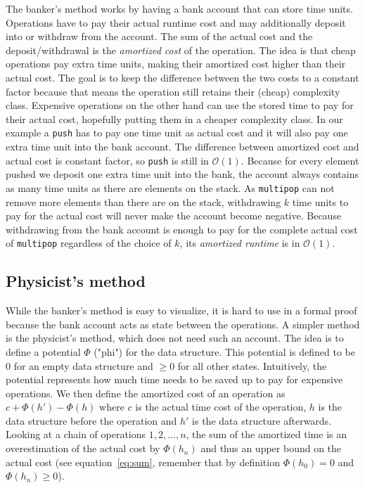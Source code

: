 \documentclass[sigplan,screen]{acmart}
\renewcommand\O[1]{$\mathcal{O}(#1)$}
\begin{document}
The banker's method works by having a bank account that can store time units. Operations have to pay their actual runtime cost and may additionally deposit into or withdraw from the account. The sum of the actual cost and the deposit/withdrawal is the \textit{amortized cost} of the operation. The idea is that cheap operations pay extra time units, making their amortized cost higher than their actual cost. The goal is to keep the difference between the two costs to a constant factor because that means the operation still retains their (cheap) complexity class. Expensive operations on the other hand can use the stored time to pay for their actual cost, hopefully putting them in a cheaper complexity class. In our example a \texttt{push} has to pay one time unit as actual cost and it will also pay one extra time unit into the bank account. The difference between amortized cost and actual cost is constant factor, so \texttt{push} is still in \O{1}. Because for every element pushed we deposit one extra time unit into the bank, the account always contains as many time units as there are elements on the stack. As \texttt{multipop} can not remove more elements than there are on the stack, withdrawing $k$ time units to pay for the actual cost will never make the account become negative. Because withdrawing from the bank account is enough to pay for the complete actual cost of \texttt{multipop} regardless of the choice of $k$, its \textit{amortized runtime} is in \O{1}.

\subsection{Physicist's method}\label{sec:physicist}

While the banker's method is easy to visualize, it is hard to use in a formal proof because the bank account acts as state between the operations. A simpler method is the physicist's method, which does not need such an account. The idea is to define a potential $\Phi$ ("phi") for the data structure. This potential is defined to be $0$ for an empty data structure and $\ge 0$ for all other states. Intuitively, the potential represents how much time needs to be saved up to pay for expensive operations. We then define the amortized cost of an operation as $c + \Phi(h') - \Phi(h)$ where $c$ is the actual time cost of the operation, $h$ is the data structure before the operation and $h'$ is the data structure afterwards. Looking at a chain of operations $1, 2, ..., n$, the sum of the amortized time is an overestimation of the actual cost by $\Phi(h_n)$ and thus an upper bound on the actual cost (see equation~\ref{eq:sum}, remember that by definition $\Phi(h_0) = 0$ and $\Phi(h_n) \ge 0$).
\end{document}
